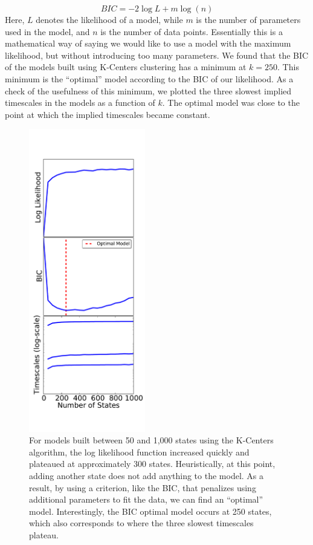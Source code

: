 \documentclass[twocolumn,floatfix,nofootinbib,aps]{revtex4-1}
\begin{document}
\begin{equation}
BIC = -2 \log L + m \log(n) 
\label{eq:bic}
\end{equation} Here, $L$ denotes the likelihood of a model, while $m$ is the number of parameters used in the model, and $n$ is the number of data points. Essentially this is a mathematical way of saying we would like to use a model with the maximum likelihood, but without introducing too many parameters. 
We found that the BIC of the models built using K-Centers clustering has a minimum at $k=250$. This minimum is the ``optimal'' model according to the BIC of our likelihood. As a check of the usefulness of this minimum, we plotted the three slowest implied timescales in the models as a function of $k$. The optimal model was close to the point at which the implied timescales became constant. 

\begin{figure}
\includegraphics[width=2in]{figs/like_comp.pdf}
\caption{For models built between 50 and 1,000 states using the K-Centers algorithm, the log likelihood function increased quickly and plateaued at approximately 300 states. Heuristically, at this point, adding another state does not add anything to the model. As a result, by using a criterion, like the BIC, that penalizes using additional parameters to fit the data, we can find an ``optimal'' model. Interestingly, the BIC optimal model occurs at 250 states, which also corresponds to where the three slowest timescales plateau.}
\label{fig:like_kcenters}
\end{figure}
\end{document}
